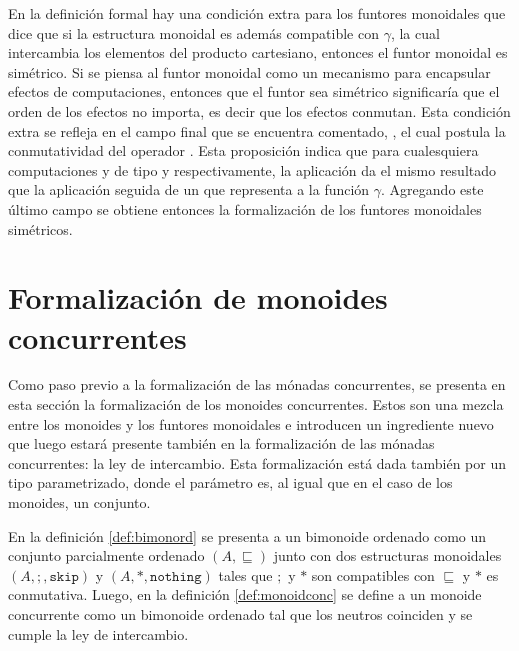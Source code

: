 En la definición formal hay una condición extra para los funtores monoidales que dice que si la estructura monoidal es además compatible con $\gamma$, la cual intercambia los elementos del producto cartesiano, entonces el funtor monoidal es simétrico. Si se piensa al funtor monoidal como un mecanismo para encapsular efectos de computaciones, entonces que el funtor sea simétrico significaría que el orden de los efectos no importa, es decir que los efectos conmutan. Esta condición extra se refleja en el campo final que se encuentra comentado, , el cual postula la conmutatividad del operador . Esta proposición indica que para cualesquiera computaciones  y  de tipo  y  respectivamente, la aplicación   da el mismo resultado que la aplicación   seguida de un  que representa a la función $\gamma$. Agregando este último campo se obtiene entonces la formalización de los funtores monoidales simétricos.

\section{Formalización de monoides concurrentes}\label{form:monoidconc}

Como paso previo a la formalización de las mónadas concurrentes, se presenta en esta sección la formalización de los monoides concurrentes. Estos son una mezcla entre los monoides y los funtores monoidales e introducen un ingrediente nuevo que luego estará presente también en la formalización de las mónadas concurrentes: la ley de intercambio. Esta formalización está dada también por un tipo  parametrizado, donde el parámetro es, al igual que en el caso de los monoides, un conjunto. 


En la definición \ref{def:bimonord} se presenta a un bimonoide ordenado como un conjunto parcialmente ordenado $(A,\sqsubseteq)$ junto con dos estructuras monoidales $(A,;,\mathtt{skip})$ y $(A,*,\mathtt{nothing})$ tales que $;$ y $*$ son compatibles con $\sqsubseteq$ y $*$ es conmutativa. Luego, en la definición \ref{def:monoidconc} se define a un monoide concurrente como un bimonoide ordenado tal que los neutros coinciden y se cumple la ley de intercambio.

